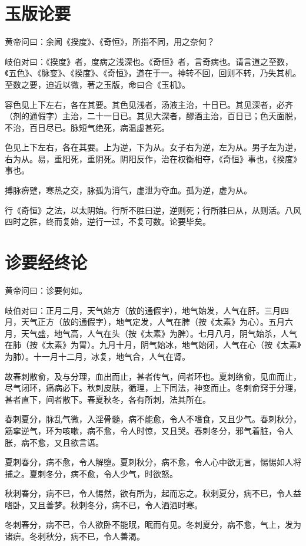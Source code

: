 \documentclass{article}%
\begin{document}
\section{玉版论要}
黄帝问曰：余闻《揆度》、《奇恒》，所指不同，用之奈何？

岐伯对曰：《揆度》者，度病之浅深也。《奇恒》者，言奇病也。请言道之至数，《五色》、《脉变》、《揆度》、《奇恒》，道在于一。神转不回，回则不转，乃失其机。至数之要，迫近以微，著之玉版，命曰合《玉机》。

容色见上下左右，各在其要。其色见浅者，汤液主治，十日已。其见深者，必齐（剂的通假字）主治，二十一日已。其见大深者，醪酒主治，百日已；色夭面脱，不治，百日尽已。脉短气绝死，病温虚甚死。

色见上下左右，各在其要。上为逆，下为从。女子右为逆，左为从。男子左为逆，右为从。易，重阳死，重阴死。阴阳反作，治在权衡相夺，《奇恒》事也，《揆度》事也。

搏脉痹躄，寒热之交，脉孤为消气，虚泄为夺血。孤为逆，虚为从。

行《奇恒》之法，以太阴始。行所不胜曰逆，逆则死；行所胜曰从，从则活。八风四时之胜，终而复始，逆行一过，不复可数。论要毕矣。
\section{诊要经终论}
黄帝问曰：诊要何如。

岐伯对曰：正月二月，天气始方（放的通假字），地气始发，人气在肝。三月四月，天气正方（放的通假字），地气定发，人气在脾（按《太素》为心）。五月六月，天气盛，地气高，人气在头（按《太素》为脾）。七月八月，阴气始杀，人气在肺（按《太素》为胃）。九月十月，阴气始冰，地气始闭，人气在心（按《太素》为肺）。十一月十二月，冰复，地气合，人气在肾。

故春刺散俞，及与分理，血出而止，甚者传气，间者环也。夏刺络俞，见血而止，尽气闭环，痛病必下。秋刺皮肤，循理，上下同法，神变而止。冬刺俞窍于分理，甚者直下，间者散下。春夏秋冬，各有所刺，法其所在。

春刺夏分，脉乱气微，入淫骨髓，病不能愈，令人不嗜食，又且少气。春刺秋分，筋挛逆气，环为咳嗽，病不愈，令人时惊，又且哭。春刺冬分，邪气着脏，令人胀，病不愈，又且欲言语。

夏刺春分，病不愈，令人解堕。夏刺秋分，病不愈，令人心中欲无言，惕惕如人将捕之。夏刺冬分，病不愈，令人少气，时欲怒。

秋刺春分，病不已，令人惕然，欲有所为，起而忘之。秋刺夏分，病不已，令人益嗜卧，又且善梦。秋刺冬分，病不已，令人洒洒时寒。

冬刺春分，病不已，令人欲卧不能眠，眠而有见。冬刺夏分，病不愈，气上，发为诸痹。冬刺秋分，病不已，令人善渴。
\end{document}
